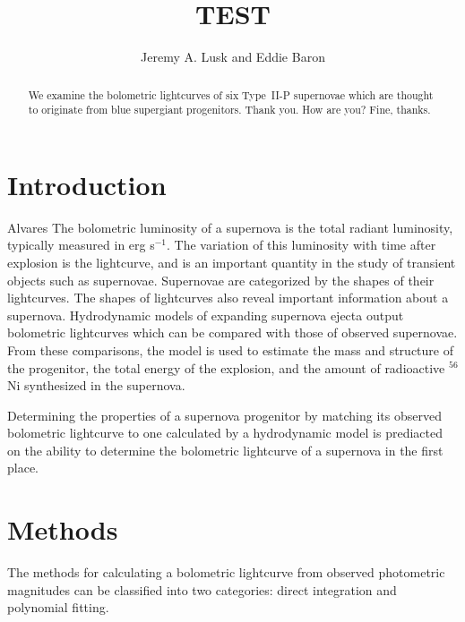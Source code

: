 \documentclass[apj]{emulateapj}
\begin{document}
\title{TEST}
\author{Jeremy A. Lusk and Eddie Baron} 


\begin{abstract}
We examine the bolometric lightcurves of six Type~II-P supernovae which are thought to originate from blue supergiant progenitors. Thank you. How are you?
Fine, thanks.

\end{abstract}

\section{Introduction}

Alvares The bolometric luminosity of a supernova is the total radiant luminosity, typically measured in erg s$^{-1}$.
The variation of this luminosity with time after explosion is the lightcurve, and is an important quantity in the study of transient objects such as supernovae.
Supernovae are categorized by the shapes of their lightcurves. %
The shapes of lightcurves also reveal important information about a supernova.
Hydrodynamic models of expanding supernova ejecta output bolometric lightcurves which can be compared with those of observed supernovae.
From these comparisons, the model is used to estimate the mass and structure of the progenitor, the total energy of the explosion, and the amount of radioactive $^{56}$Ni synthesized in the supernova.

Determining the properties of a supernova progenitor by matching its observed bolometric lightcurve to one calculated by a hydrodynamic model is prediacted on the ability to determine the bolometric lightcurve of a supernova in the first place.

\section{Methods}

The methods for calculating a bolometric lightcurve from observed photometric magnitudes can be classified into two categories: direct integration and polynomial fitting.
\end{document}
